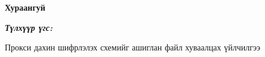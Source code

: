 

\begin{center}
    {\scshape\Large \univname\par} %
    {\scshape\large \facname\par}\vspace{0.5cm} %
    {\huge\textbf{{Хураангуй}} \par}
    \bigskip
    {\Large{\ttitle} \par} %
    \bigskip

    {\normalsize \shortname \par} %
    \addressname
\end{center}

\textit{\textbf{Түлхүүр үгс: \keywordnames}}
\bigskip

Прокси дахин шифрлэлэх схемийг ашиглан файл хуваалцах үйлчилгээ